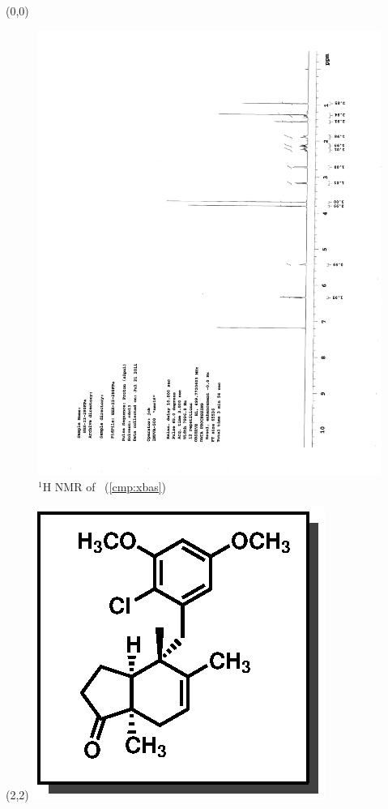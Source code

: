 \begin{textblock}{20}(0,0)
\begin{figure}[htb]
\caption{$^1$H NMR of \CMPxbas\ (\ref{cmp:xbas})}
\includegraphics[scale=0.75, trim = 0mm 0mm 0mm 5mm,
clip]{chp_singlecarbon/images/nmr/xbasH}
\vspace{-100pt}
\end{figure}
\end{textblock}
\begin{textblock}{1}(2,2)
\includegraphics[scale=0.8, angle=90]{chp_singlecarbon/images/xbas}
\end{textblock}
